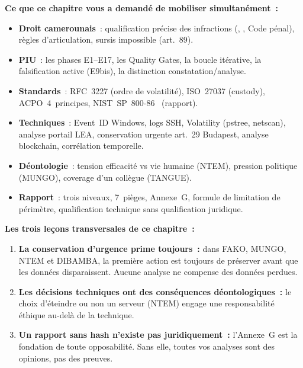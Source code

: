 \begin{boxresume}
\textbf{Ce que ce chapitre vous a demandé de mobiliser simultanément~:}
\begin{itemize}
    \item \textbf{Droit camerounais}~: qualification précise des
          infractions (, ,
          Code pénal), règles d'articulation, sursis impossible
          (art.~89).

    \item \textbf{PIU}~: les phases E1--E17, les Quality Gates,
          la boucle itérative, la falsification active (E9bis),
          la distinction constatation/analyse.

    \item \textbf{Standards}~: RFC~3227 (ordre de volatilité),
          ISO~27037 (custody), ACPO~4~principes, NIST~SP~800-86~\cite{nist80086}
          (rapport).

    \item \textbf{Techniques}~: Event~ID Windows, logs SSH, Volatility
          (pstree, netscan), analyse portail LEA, conservation urgente
          art.~29 Budapest, analyse blockchain, corrélation temporelle.

    \item \textbf{Déontologie}~: tension efficacité vs vie humaine
          (NTEM), pression politique (MUNGO), coverage d'un
          collègue (TANGUE).

    \item \textbf{Rapport}~: trois niveaux, 7~pièges, Annexe~G,
          formule de limitation de périmètre, qualification
          technique sans qualification juridique.
\end{itemize}

\textbf{Les trois leçons transversales de ce chapitre~:}
\begin{enumerate}
    \item \textbf{La conservation d'urgence prime toujours~:}
          dans FAKO, MUNGO, NTEM et DIBAMBA, la première
          action est toujours de préserver avant que les données
          disparaissent. Aucune analyse ne compense des données
          perdues.
    \item \textbf{Les décisions techniques ont des conséquences
          déontologiques~:} le choix d'éteindre ou non un serveur
          (NTEM) engage une responsabilité éthique au-delà de
          la technique.
    \item \textbf{Un rapport sans hash n'existe pas juridiquement~:}
          l'Annexe~G est la fondation de toute opposabilité.
          Sans elle, toutes vos analyses sont des opinions,
          pas des preuves.
\end{enumerate}
\end{boxresume}

